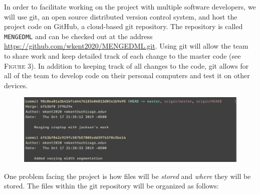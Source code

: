 \documentclass[12pt]{amsart}
\begin{document}
\begin{figure}[h]
\begin{center}
\end{center}
\end{figure}

In order to facilitate working on the project with multiple software developers, we will use git, an open source distributed version control system, and host the project code on GitHub, a cloud-based git repository. The repository is called \texttt{MENGEDML} and can be checked out at the address \url{https://github.com/wkent2020/MENGEDML.git}. Using git will allow the team to share work and keep detailed track of each change to the master code (see \textsc{Figure 3}). In addition to keeping track of all changes to the code, git allows for all of the team to develop code on their personal computers and test it on other devices. 

\begin{figure}[h]
\begin{center}
\includegraphics[width=6in]{1.png}
\end{center}
\end{figure}

One problem facing the project is how files will be \textit{stored} and \textit{where} they will be stored. The files within the git repository will be organized as follows:
\end{document}
